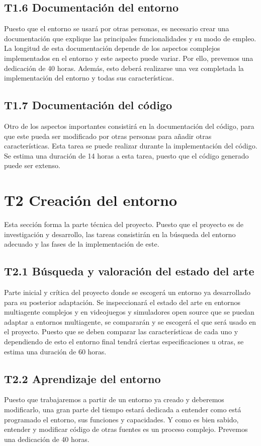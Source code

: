 \subsection*{T1.6 Documentación del entorno}
Puesto que el entorno se usará por otras personas, es necesario crear una documentación que explique las principales funcionalidades y su modo de empleo. La longitud de esta documentación depende de los aspectos complejos implementados en el entorno y este aspecto puede variar. Por ello, prevemos una dedicación de 40 horas. Además, esto deberá realizarse una vez completada la implementación del entorno y todas sus características.

\subsection*{T1.7 Documentación del código}
Otro de los aspectos importantes consistirá en la documentación del código, para que este pueda ser modificado por otras personas para añadir otras características. Esta tarea se puede realizar durante la implementación del código. Se estima una duración de 14 horas a esta tarea, puesto que el código generado puede ser extenso.

\section{T2 Creación del entorno}

Esta sección forma la parte técnica del proyecto. Puesto que el proyecto es de investigación y desarrollo, las tareas consistirán en la búsqueda del entorno adecuado y las fases de la implementación de este.

\subsection*{T2.1 Búsqueda y valoración del estado del arte}
Parte inicial y crítica del proyecto donde se escogerá un entorno ya desarrollado para su posterior adaptación. Se inspeccionará el estado del arte en entornos multiagente complejos y en videojuegos y simuladores open source que se puedan adaptar a entornos multiagente, se compararán y se escogerá el que será usado en el proyecto. Puesto que se deben comparar las características de cada uno y dependiendo de esto el entorno final tendrá ciertas especificaciones u otras, se estima una duración de 60 horas.

\subsection*{T2.2 Aprendizaje del entorno}
Puesto que trabajaremos a partir de un entorno ya creado y deberemos modificarlo, una gran parte del tiempo estará dedicada a entender como está programado el entorno, sus funciones y capacidades. Y como es bien sabido, entender y modificar código de otras fuentes es un proceso complejo. Prevemos una dedicación de 40 horas.

